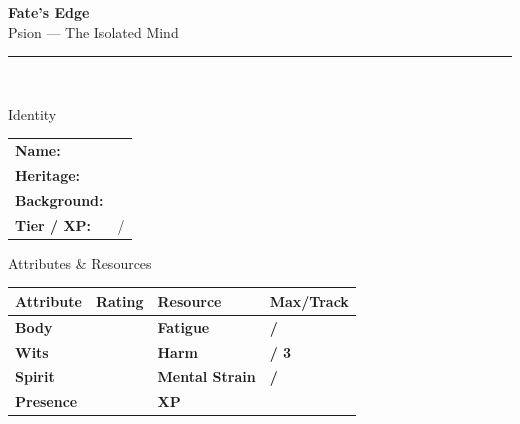 \documentclass[10pt]{article}
\begin{document}
\begin{center}
    {\Huge\bfseries\sffamily\color{edgered} Fate's Edge}\\[0.2em]
    {\large\sffamily Psion --- The Isolated Mind}\\[0.5em]
    \rule{0.5\textwidth}{0.5pt}\\[1em]
\end{center}

\begin{minipage}[t]{0.48\linewidth}
    \begin{charbox}{Identity}
        \begin{tabular}{p{2.5cm} p{5cm}}
            \textbf{Name:} & \underline{\hspace{4cm}} \\
            \textbf{Heritage:} & \underline{\hspace{4cm}} \\
            \textbf{Background:} & \underline{\hspace{4cm}} \\
            \textbf{Tier / XP:} & \underline{\hspace{2cm}} / \underline{\hspace{2cm}} \\
        \end{tabular}
    \end{charbox}
    
    \vspace{0.5em}
    
    \begin{charbox}{Attributes \& Resources}
        \begin{tabular}{>{\bfseries}p{2.5cm} >{\bfseries}p{1.5cm} >{\bfseries}p{2.5cm} >{\bfseries}p{1.5cm}}
            \toprule
            \textbf{Attribute} & \textbf{Rating} & \textbf{Resource} & \textbf{Max/Track} \\
            \midrule
            Body & \underline{\hspace{1.5cm}} & Fatigue & \underline{\hspace{1.5cm}} / \underline{\hspace{1.5cm}} \\
            Wits & \underline{\hspace{1.5cm}} & Harm & \underline{\hspace{1.5cm}} / 3 \\
            Spirit & \underline{\hspace{1.5cm}} & Mental Strain & \underline{\hspace{1.5cm}} / \underline{\hspace{1.5cm}} \\
            Presence & \underline{\hspace{1.5cm}} & XP & \underline{\hspace{1.5cm}} \\
            \bottomrule
        \end{tabular}
    \end{charbox}
    

\end{minipage}
\end{document}
